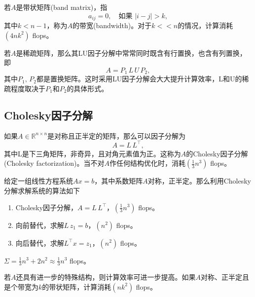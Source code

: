 \begin{subappendices}
若$A$是带状矩阵(band matrix)，指
\begin{equation}
  \label{eq:numlin-band-matrix-def}
  a_{ij} = 0, \quad \text{如果 } \left| i - j \right| > k,
\end{equation}
其中$k < n-1$，称为$A$的带宽(bandwidth)。对于$k << n$的情况，计算消耗$\left( 4 n k^{2} \right)$ flops。

若$A$是稀疏矩阵，那么其LU因子分解中常常同时既含有行置换，也含有列置换，即
\begin{equation*}
  A = P_{1} \, L \, U \, P_{2},
\end{equation*}
其中$P_{1}, \, P_{2}$都是置换矩阵。这时采用LU因子分解会大大提升计算效率，L和U的稀疏程度取决于$P_{1}$和$P_{2}$的具体形式。

\subsection{Cholesky因子分解}
\label{sec:numlin-factorization-cholesky}
如果$A \in \mathbb{R}^{n \times n}$是对称且正半定的矩阵，那么可以因子分解为
\begin{equation}
  \label{eq:numlin-factorization-cholesky}
  A = L \, L^{\top},
\end{equation}
其中L是下三角矩阵，非奇异，且对角元素值为正。这称为$A$的Cholesky因子分解(Cholesky factorization)。当不对$A$作任何结构优化时，消耗$ \left( \frac{1}{3} n^{3} \right)$ flops。

\begin{algorithm}[利用Cholesky分解求解正定线性方程系统]
  \label{algorithm:numlin-factorization-cholesky}
给定一组线性方程系统$A x = b$，其中系数矩阵$A$对称，正半定。那么利用Cholesky分解求解系统的算法如下
\begin{enumerate}
  \item Cholesky因子分解，$A = L \, L^{\top}$，$\left( \frac{1}{3} n^{3} \right)$ flops。
  \item 向前替代，求解$L \, z_{1} = b$，$\left( n^{2} \right)$ flops。
  \item 向后替代，求解$L^{\top} x = z_{1}$，$\left( n^{2} \right)$ flops。
\end{enumerate}
$\Sigma = \frac{1}{3} n^{3} + 2 n^{2} \approx \frac{1}{3} n^{3}$ flops。
\end{algorithm}

若$A$还具有进一步的特殊结构，则计算效率可进一步提高。如果$A$对称、正半定且是个带宽为$k$的带状矩阵，计算消耗$\left(n k^{2} \right)$ flops。


\end{subappendices}
